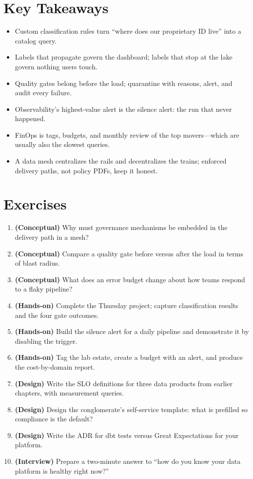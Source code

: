 \section*{Key Takeaways}
\begin{itemize}
    \item Custom classification rules turn ``where does our proprietary ID live'' into a catalog query.
    \item Labels that propagate govern the dashboard; labels that stop at the lake govern nothing users touch.
    \item Quality gates belong before the load; quarantine with reasons, alert, and audit every failure.
    \item Observability's highest-value alert is the silence alert: the run that never happened.
    \item FinOps is tags, budgets, and monthly review of the top movers---which are usually also the slowest queries.
    \item A data mesh centralizes the rails and decentralizes the trains; enforced delivery paths, not policy PDFs, keep it honest.
\end{itemize}

\section{Exercises}
\begin{enumerate}
    \item \textbf{(Conceptual)} Why must governance mechanisms be embedded in the delivery path in a mesh?
    \item \textbf{(Conceptual)} Compare a quality gate before versus after the load in terms of blast radius.
    \item \textbf{(Conceptual)} What does an error budget change about how teams respond to a flaky pipeline?
    \item \textbf{(Hands-on)} Complete the Thursday project; capture classification results and the four gate outcomes.
    \item \textbf{(Hands-on)} Build the silence alert for a daily pipeline and demonstrate it by disabling the trigger.
    \item \textbf{(Hands-on)} Tag the lab estate, create a budget with an alert, and produce the cost-by-domain report.
    \item \textbf{(Design)} Write the SLO definitions for three data products from earlier chapters, with measurement queries.
    \item \textbf{(Design)} Design the conglomerate's self-service template: what is prefilled so compliance is the default?
    \item \textbf{(Design)} Write the ADR for dbt tests versus Great Expectations for your platform.
    \item \textbf{(Interview)} Prepare a two-minute answer to ``how do you know your data platform is healthy right now?''
\end{enumerate}

